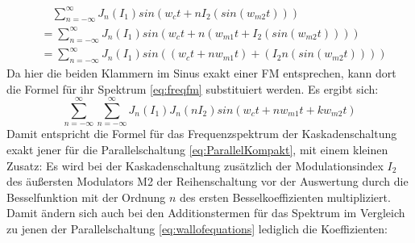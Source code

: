 \begin{equation}
\begin{split}
& \quad \sum_{n=-\infty}^{\infty}J_n(I_1)sin(w_{c}t + nI_2(sin(w_{m2}t))) \\
&= \sum_{n=-\infty}^{\infty}J_n(I_1)sin(w_{c}t+n(w_{m1}t + I_2(sin(w_{m2}t)))) \\
&= \sum_{n=-\infty}^{\infty}J_n(I_1)sin((w_{c}t+nw_{m1}t) + (I_2n(sin(w_{m2}t))))
\end{split}
\end{equation}
Da hier die beiden Klammern im Sinus exakt einer FM entsprechen, kann dort die Formel für ihr Spektrum \ref{eq:freqfm} substituiert werden. Es ergibt sich:
\begin{equation}
\sum_{n=-\infty}^{\infty}\sum_{n=-\infty}^{\infty}J_n(I_1)J_n(nI_2)sin(w_{c}t+nw_{m1}t + kw_{m2}t)
\end{equation}
Damit entspricht die Formel für das Frequenzspektrum der Kaskadenschaltung exakt jener für die Parallelschaltung \ref{eq:ParallelKompakt}, mit einem kleinen Zusatz: Es wird bei der Kaskadenschaltung zusätzlich der Modulationsindex $ I_2 $ des äußersten Modulators M2 der Reihenschaltung vor der Auswertung durch die Besselfunktion mit der Ordnung $ n $ des ersten Besselkoeffizienten multipliziert. Damit ändern sich auch bei den Additionstermen für das Spektrum im Vergleich zu jenen der Parallelschaltung \ref{eq:wallofequations} lediglich die Koeffizienten:
